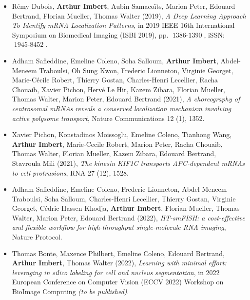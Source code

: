 \begin{itemize}
	\item Rémy Dubois, \textbf{Arthur Imbert}, Aubin Samacoïts, Marion Peter, Edouard Bertrand, Florian Mueller, Thomas Walter (2019), \textit{A Deep Learning Approach To Identify mRNA Localization Patterns}, in 2019 IEEE 16th International Symposium on Biomedical Imaging (ISBI 2019), pp. $\operatorname{1386-1390}$, iSSN: $\operatorname{1945-8452}$.
	\item Adham Safieddine, Emeline Coleno, Soha Salloum\footnotemark[1], \textbf{Arthur Imbert\footnotemark[1]}, Abdel-Meneem Traboulsi, Oh Sung Kwon, Frederic Lionneton, Virginie Georget, Marie-Cécile Robert, Thierry Gostan, Charles-Henri Lecellier, Racha Chouaib, Xavier Pichon, Hervé Le Hir, Kazem Zibara, Florian Mueller, Thomas Walter, Marion Peter, Edouard Bertrand (2021), \textit{A choreography of centrosomal mRNAs reveals a conserved localization mechanism involving active polysome transport}, Nature Communications 12 (1), 1352.
	\item Xavier Pichon\footnotemark[1], Konstadinos Moissoglu\footnotemark[1], Emeline Coleno, Tianhong Wang, \textbf{Arthur Imbert}, Marie-Cecile Robert, Marion Peter, Racha Chouaib, Thomas Walter, Florian Mueller, Kazem Zibara, Edouard Bertrand, Stavroula Mili (2021), \textit{The kinesin KIF1C transports APC-dependent mRNAs to cell protrusions}, RNA 27 (12), 1528.
	\item Adham Safieddine, Emeline Coleno, Frederic Lionneton, Abdel-Meneem Traboulsi, Soha Salloum, Charles-Henri Lecellier, Thierry Gostan, Virginie Georget, Cédric Hassen-Khodja, \textbf{Arthur Imbert}, Florian Mueller, Thomas Walter, Marion Peter, Edouard Bertrand (2022), \textit{HT-smFISH: a cost-effective and flexible workflow for high-throughput single-molecule RNA imaging}, Nature Protocol.
	\item Thomas Bonte, Maxence Philbert, Emeline Coleno, Edouard Bertrand, \textbf{Arthur Imbert}, Thomas Walter (2022), \textit{Learning with minimal effort: leveraging in silico labeling for cell and nucleus segmentation}, in 2022 European Conference on Computer Vision (ECCV 2022) Workshop on BioImage Computing \textit{(to be published)}.
\end{itemize}